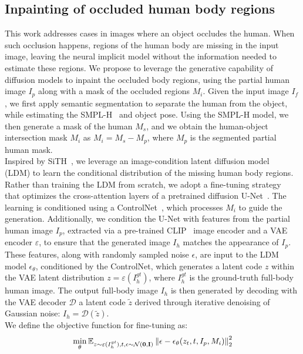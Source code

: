 \subsection{Inpainting of occluded human body regions}
\label{ssec:diff_model}
This work addresses cases in images where an object occludes the human. When such occlusion happens, regions of the human body are missing in the input image, leaving the neural implicit model without the information needed to estimate these regions. We propose to leverage the generative capability of diffusion models to inpaint the occluded body regions, using the partial human image $I_p$ along with a mask of the occluded regions $M_i$. Given the input image $I_f$, we first apply semantic segmentation to separate the human from the object, while estimating the SMPL-H~\cite{smplh} and object pose. Using the SMPL-H model, we then generate a mask of the human $M_s$, and we obtain the human-object intersection mask $M_i$ as $M_i=M_s-M_p$, where $M_p$ is the segmented partial human mask.
%
\\Inspired by SiTH~\cite{ho2024sith}, we leverage an image-condition latent diffusion model~\cite{rombach2022high} (LDM) to learn the conditional distribution of the missing human body regions. Rather than training the LDM from scratch, we adopt a fine-tuning strategy~\cite{kumari2023multi, zhang2023adding} that optimizes the cross-attention layers of a pretrained diffusion U-Net~\cite{rombach2022high}. The learning is conditioned using a ControlNet~\cite{zhang2023adding}, which processes $M_i$ to guide the generation. Additionally, we condition the U-Net with features from the partial human image $I_p$, extracted via a pre-trained CLIP~\cite{clip} image encoder and a VAE encoder $\varepsilon$,  to ensure that the generated image $I_h$ matches the appearance of $I_p$. These features, along with randomly sampled noise $\epsilon$, are input to the LDM model $\epsilon_{\theta}$, conditioned by the ControlNet, which generates a latent code $z$ within the VAE latent distribution $z = \varepsilon(I^{gt}_h)$, where $I^{gt}_h$ is the ground-truth full-body human image. The output full-body image $I_h$ is then generated by decoding with the VAE decoder  $\mathcal{D}$  a latent code $\tilde{z}$ derived through iterative denoising of Gaussian noise: $I_h = \mathcal{D}(\tilde{z})$.
\\We define the objective function for fine-tuning as:
\vspace{-0.2cm}
\begin{equation}
    \min_{\theta}\mathbb{E}_{z \sim \varepsilon(I^{gt}_h),t, \epsilon \sim \mathcal{N}(\textbf{0},\textbf{I}) }\left\lVert \epsilon - \epsilon_{\theta}(z_t, t, I_p, M_i) \right\rVert^2_2
\vspace{-0.2cm}
\end{equation}
